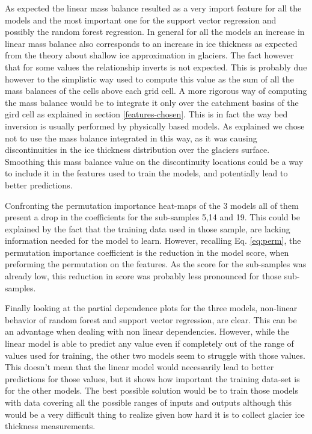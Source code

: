 As expected the linear mass balance resulted as a very import feature for all the models and the most important one for the support vector regression and possibly the random forest regression. In general for all the models an increase in linear mass balance also corresponds to an increase in ice thickness as expected from the theory about shallow ice approximation in glaciers. The fact however that for some values the relationship inverts is not expected. This is probably due however to the simplistic way used to compute this value as the sum of all the mass balances of the cells above each grid cell. A more rigorous way of computing the mass balance would be to integrate it only over the catchment basins of the gird cell as explained in section \ref{features-chosen}. This is in fact the way bed inversion is usually performed by physically based models. As explained we chose not to use the mass balance integrated in this way, as it was causing discontinuities in the ice thickness distribution over the glaciers surface. Smoothing this mass balance value on the discontinuity locations could be a way to include it in the features used to train the models, and potentially lead to better predictions. 

Confronting the permutation importance heat-maps of the 3 models all of them present a drop in the coefficients for the sub-samples 5,14 and 19. This could be explained by the fact that the training data used in those sample, are lacking information needed for the model to learn. However, recalling Eq. \ref{eq:perm}, the permutation importance coefficient is the reduction in the model score, when preforming the permutation on the features. As the score for the sub-samples was already low, this reduction in score was probably less pronounced for those sub-samples. 

Finally looking at the partial dependence plots for the three models, non-linear behavior of random forest and support vector regression, are clear. This can be an advantage when dealing with non linear dependencies. However, while the linear model is able to predict any value even if completely out of the range of values used for training, the other two models seem to struggle with those values. This doesn't mean that the linear model would necessarily lead to better predictions for those values, but it shows how important the training data-set is for the other models. The best possible solution would be to train those models with data covering all the possible ranges of inputs and outputs although this would be a very difficult thing to realize given how hard it is to collect glacier ice thickness measurements.


